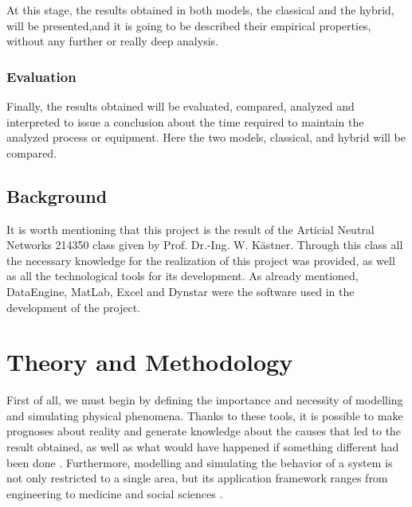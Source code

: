 \documentclass{article}
\begin{document}
\begin{doublespacing}
\par At this stage, the results obtained in both models, the classical and the hybrid, will be presented,and it is going to be described their empirical properties, without any further or really deep analysis.

\subsubsection{Evaluation} 

\par Finally, the results obtained will be evaluated, compared, analyzed and interpreted to issue a conclusion about the time required to maintain the analyzed process or equipment. Here the two models, classical, and hybrid will be compared.

\subsection{Background} 

\par It is worth mentioning that this project is the result of the Articial Neutral Networks 214350 class given by Prof. Dr.-Ing. W. Kästner. Through this class all the necessary knowledge for the realization of this project was provided, as well as all the technological tools for its development. As already mentioned, DataEngine, MatLab, Excel and Dynstar were the software used in the development of the project. 






\newpage 
\section{Theory and Methodology}

\par First of all, we must begin by defining the importance and necessity of modelling and simulating physical phenomena. Thanks to these tools, it is possible to make prognoses about reality and generate knowledge about the causes that led to the result obtained, as well as what would have happened if something different had been done \cite{kaestner:basics}. Furthermore, modelling and simulating the behavior of a system is not only restricted to a single area, but its application framework ranges from engineering to medicine and social sciences \cite{kaestner:basics}.


\end{doublespacing}
\end{document}
